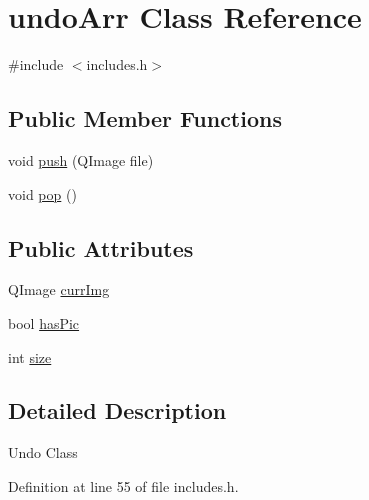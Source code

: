 \hypertarget{classundo_arr}{\section{undo\-Arr Class Reference}
\label{classundo_arr}
}


{\ttfamily \#include $<$includes.\-h$>$}

\subsection*{Public Member Functions}
\begin{DoxyCompactItemize}
\item 
void \hyperlink{classundo_arr_a55d5c4487ef355fa732fa6db7d57855d}{push} (Q\-Image file)
\item 
void \hyperlink{classundo_arr_a16c74ec4a7e73d8852d634c190bcd51c}{pop} ()
\end{DoxyCompactItemize}
\subsection*{Public Attributes}
\begin{DoxyCompactItemize}
\item 
Q\-Image \hyperlink{classundo_arr_ac8927631ec42f0f4a56ccd66dfbfc732}{curr\-Img}
\item 
bool \hyperlink{classundo_arr_a73c53d3302242f3b5f2e504d9a79fde7}{has\-Pic}
\item 
int \hyperlink{classundo_arr_a01b2d58c78f87f57f163702f565731a2}{size}
\end{DoxyCompactItemize}


\subsection{Detailed Description}
Undo Class 

Definition at line 55 of file includes.\-h.



